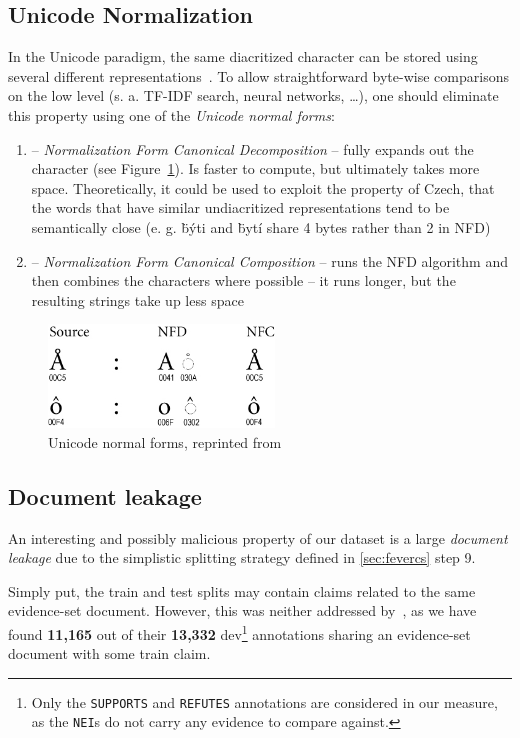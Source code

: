 
\subsection{Unicode Normalization}
\label{sub:canonical}
 In the Unicode paradigm, the same diacritized character can be stored using several different representations~\cite{unicode}. To allow straightforward byte-wise comparisons on the low level (s. a. TF-IDF search, neural networks, \dots), one should eliminate this property using one of the \textit{Unicode normal forms}:
 
\begin{enumerate}
    \item {} -- \textit{Normalization Form Canonical Decomposition} -- fully expands out the character (see Figure~\ref{fig:unicode}). Is faster to compute, but ultimately takes more space. Theoretically, it could be used to exploit the property of Czech, that the words that have similar undiacritized representations tend to be semantically close (e. g. \"{býti} and \"{bytí} share 4 bytes rather than 2 in NFD)
    \item {} -- \textit{Normalization Form Canonical Composition} -- runs the NFD algorithm and then combines the characters where possible -- it runs longer, but the resulting strings take up less space
\end{enumerate}

\begin{figure}[H]
\includegraphics[width=6cm]{fig/UAX15-NormFig4.jpg}
\caption{Unicode normal forms, reprinted from~\cite{unicode}}
\label{fig:unicode}
\end{figure}

\subsection{Document leakage}
\label{sec:leakage}
An interesting and possibly malicious property of our dataset is a large \textit{document leakage} due to the simplistic splitting strategy defined in \ref{sec:fevercs} step 9.

Simply put, the \textsf{train} and \textsf{test} splits may contain claims related to the same evidence-set document. However, this was neither addressed by~\cite{fever}, as we have found \textbf{11,165} out of their \textbf{13,332} \textsf{dev}\footnote{Only the \texttt{SUPPORTS} and \texttt{REFUTES} annotations are considered in our measure, as the \texttt{NEI}s do not carry any evidence to compare against.}  annotations sharing an evidence-set document with some \textsf{train} claim. 

